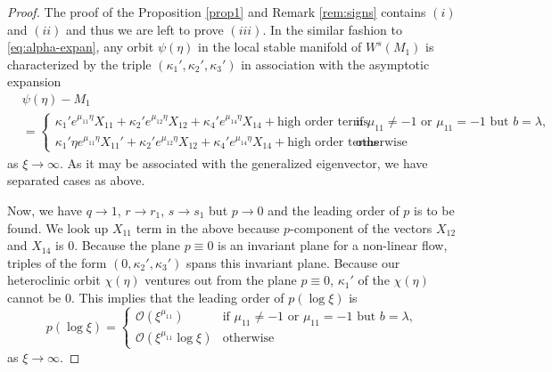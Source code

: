 \documentclass[a4paper,11pt]{article}
\def\BO{{\mathcal{O}}}
\begin{document}
\begin{proof}
The proof of the Proposition \ref{prop1} and Remark \ref{rem:signs} contains $(i)$ and $(ii)$ and thus we are left to prove $(iii)$. In the similar fashion to \eqref{eq:alpha-expan}, any orbit $\psi(\eta)$ in the local stable manifold of $W^s(M_1)$ is characterized by the triple $(\kappa_1',\kappa_2',\kappa_3')$ in association with the asymptotic expansion
\begin{equation}
\begin{aligned}
 &\psi(\eta) -M_1\\
 &= \begin{cases} \kappa_1'e^{\mu_{11}\eta}X_{11} + \kappa_2'e^{\mu_{12}\eta}X_{12} + \kappa_4'e^{\mu_{14}\eta}X_{14} + \text{high order terms} & \text{if $\mu_{11}\ne-1$ or $\mu_{11}=-1$ but $b=\lambda$,}\\
 \kappa_1'\eta e^{\mu_{11}\eta}X_{11}' + \kappa_2'e^{\mu_{12}\eta}X_{12} + \kappa_4'e^{\mu_{14}\eta}X_{14} + \text{high order terms} & \text{otherwise }
 \end{cases}
\end{aligned}
\end{equation}
as $\xi \rightarrow \infty$. As it may be associated with the generalized eigenvector, we have separated cases as above.

Now, we have $q \rightarrow 1$, $r \rightarrow r_1$, $s \rightarrow s_1$ but $p \rightarrow 0$ and the leading order of $p$ is to be found. We look up  $X_{11}$ term in the above because $p$-component of the vectors $X_{12}$ and $X_{14}$ is $0$. Because the plane $p\equiv0$ is an invariant plane for a non-linear flow, triples of the form $(0,\kappa_2',\kappa_3')$ spans this invariant plane. Because our heteroclinic orbit $\chi(\eta)$ ventures out from the plane $p\equiv0$, $\kappa_1'$ of the $\chi(\eta)$ cannot be $0$.
This implies that the leading order of $p(\log\xi)$ is 
$$p(\log\xi) = \begin{cases} \BO(\xi^{\mu_{11}}) & \text{if $\mu_{11}\ne-1$ or $\mu_{11}=-1$ but $b=\lambda$,}\\
 \BO(\xi^{\mu_{11}}\log\xi) & \text{otherwise}
 \end{cases}
 $$
as $\xi \rightarrow \infty$. 


\end{proof}
\end{document}
